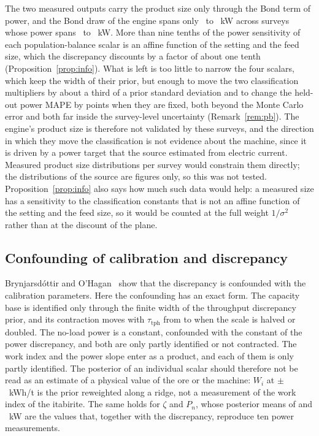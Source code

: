 \documentclass[journal]{IEEEtran}
\begin{document}
The two measured outputs carry the product size only through the Bond term of power, and the Bond draw of the engine
spans only \bondKwMin\ to \bondKwMax~kW across surveys whose power spans \kwMMin\ to \kwMMax~kW. More than nine tenths of the
power sensitivity of each population-balance scalar is an affine function of the setting and the feed size, which the
discrepancy discounts by a factor of about one tenth (Proposition~\ref{prop:info}). What is left is too little to narrow
the four scalars, which keep the width of their prior, but enough to move the two classification multipliers by about a
third of a prior standard deviation and to change the held-out power MAPE by \balFixGainKw{} points when they are fixed,
both beyond the Monte Carlo error and both far inside the survey-level uncertainty (Remark~\ref{rem:pb}). The engine's
product size is therefore not validated by these surveys, and the direction in which they move the classification is not
evidence about the machine, since it is driven by a power target that the source estimated from electric current.
Measured product size distributions per survey would constrain them directly; the
distributions of the source are figures only, so this was not tested. Proposition~\ref{prop:info} also says how much such
data would help: a measured size has a sensitivity to the classification constants that is not an affine function of the
setting and the feed size, so it would be counted at the full weight $1/\sigma^2$ rather than at the discount of the plane.

\subsection{Confounding of calibration and discrepancy}

Brynjarsd\'ottir and O'Hagan~\cite{brynj} show that the discrepancy is confounded with the calibration parameters. Here the
confounding has an exact form. The capacity base is identified only through the finite width of the throughput discrepancy
prior, and its contraction moves with $\tau_{\mathrm{tph}}$ from \abTauHalfQRefContr{} to \abTauDoubleQRefContr{} when the
scale is halved or doubled. The no-load power is a constant, confounded with the constant of the power discrepancy, and both
are only partly identified or not contracted. The work index and the power slope enter as a product, and each of them is only
partly identified. The posterior of an individual scalar should therefore not be read as an estimate of a physical value of
the ore or the machine: $W_i$ at \wiMean{} $\pm$ \wiSd~kWh/t is the prior reweighted along a ridge, not a measurement of the
work index of the itabirite. The same holds for $\zeta$ and $P_n$, whose posterior means of \zetaMean{} and \pnMean~kW are
the values that, together with the discrepancy, reproduce ten power measurements.
\end{document}
